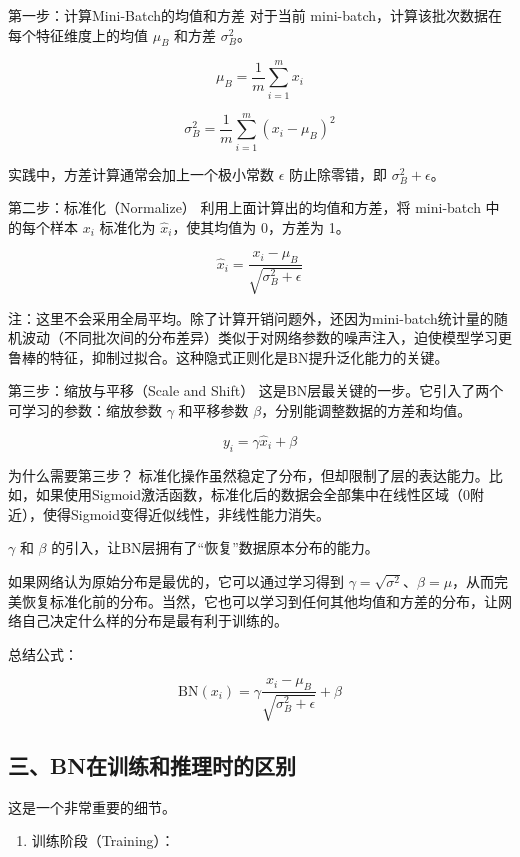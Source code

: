 第一步：计算Mini-Batch的均值和方差
对于当前 mini-batch，计算该批次数据在每个特征维度上的均值 \(\mu_B\) 和方差 \(\sigma_B^2\)。

\[
\mu_B=\frac{1}{m}\sum_{i=1}^{m}x_i
\]

\[
\sigma_B^2=\frac{1}{m}\sum_{i=1}^{m}(x_i-\mu_B)^2
\]

实践中，方差计算通常会加上一个极小常数 \(\epsilon\) 防止除零错，即 \(\sigma_B^2+\epsilon\)。

第二步：标准化（Normalize）
利用上面计算出的均值和方差，将 mini-batch 中的每个样本 \(x_i\) 标准化为 \(\hat{x}_i\)，使其均值为 0，方差为 1。

\[
\hat{x}_i=\frac{x_i-\mu_B}{\sqrt{\sigma_B^2+\epsilon}}
\]

注：这里不会采用全局平均。除了计算开销问题外，还因为mini-batch统计量的随机波动（不同批次间的分布差异）类似于对网络参数的噪声注入，迫使模型学习更鲁棒的特征，抑制过拟合。这种隐式正则化是BN提升泛化能力的关键。

第三步：缩放与平移（Scale and Shift）
这是BN层最关键的一步。它引入了两个可学习的参数：缩放参数 \(\gamma\) 和平移参数 \(\beta\)，分别能调整数据的方差和均值。

\[
y_i=\gamma\hat{x}_i+\beta
\]

为什么需要第三步？
标准化操作虽然稳定了分布，但却限制了层的表达能力。比如，如果使用Sigmoid激活函数，标准化后的数据会全部集中在线性区域（0附近），使得Sigmoid变得近似线性，非线性能力消失。

\(\gamma\) 和 \(\beta\) 的引入，让BN层拥有了``恢复''数据原本分布的能力。

如果网络认为原始分布是最优的，它可以通过学习得到 \(\gamma=\sqrt{\sigma^2}\)、\(\beta=\mu\)，从而完美恢复标准化前的分布。当然，它也可以学习到任何其他均值和方差的分布，让网络自己决定什么样的分布是最有利于训练的。

总结公式：

\[
\mathrm{BN}(x_i)=\gamma\frac{x_i-\mu_B}{\sqrt{\sigma_B^2+\epsilon}}+\beta
\]

\hypertarget{ux4e09bnux5728ux8badux7ec3ux548cux63a8ux7406ux65f6ux7684ux533aux522b}{%
\subsection{三、BN在训练和推理时的区别}\label{ux4e09bnux5728ux8badux7ec3ux548cux63a8ux7406ux65f6ux7684ux533aux522b}}

这是一个非常重要的细节。

\begin{enumerate}
\def\labelenumi{\arabic{enumi}.}
\tightlist
\item
  训练阶段（Training）：
\end{enumerate}

